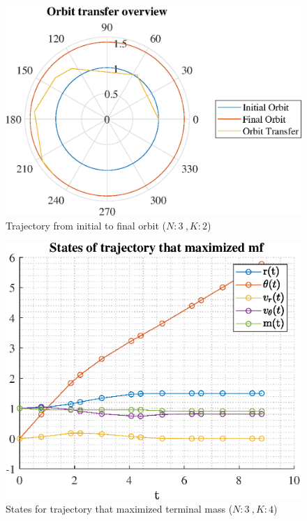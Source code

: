 \documentclass[]{article}
\begin{document}
	\begin{figure}
		\centering
		\includegraphics[scale=0.75]{orbit_N3_K2_C3_mf.eps}
		\caption{Trajectory from initial to final orbit (\(N:3\ , K:2\))}
		\label{fig:orbit_N3_K2_C3_mf}
	\end{figure}
	\begin{figure}
		\centering
		\includegraphics[scale=0.75]{states_N3_K4_C3_mf.eps}
		\caption{States for trajectory that maximized terminal mass (\(N:3\ , K:4\))}
		\label{fig:states_N3_K4_C3_mf}
	\end{figure}
\end{document}
